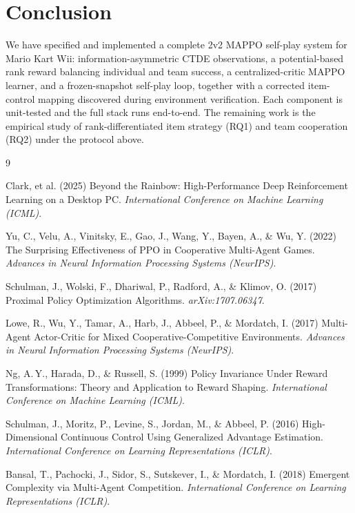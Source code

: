 \documentclass{article}
\begin{document}
\section{Conclusion}

We have specified and implemented a complete 2v2 MAPPO self-play system for Mario
Kart Wii: information-asymmetric CTDE observations, a potential-based rank reward
balancing individual and team success, a centralized-critic MAPPO learner, and a
frozen-snapshot self-play loop, together with a corrected item-control mapping
discovered during environment verification. Each component is unit-tested and the
full stack runs end-to-end. The remaining work is the empirical study of
rank-differentiated item strategy (RQ1) and team cooperation (RQ2) under the
protocol above.


\begin{thebibliography}{9}
\small

Clark, et al. (2025) Beyond the Rainbow: High-Performance Deep Reinforcement
Learning on a Desktop PC. \textit{International Conference on Machine Learning
(ICML)}.

Yu, C., Velu, A., Vinitsky, E., Gao, J., Wang, Y., Bayen, A., \& Wu, Y. (2022)
The Surprising Effectiveness of PPO in Cooperative Multi-Agent Games.
\textit{Advances in Neural Information Processing Systems (NeurIPS)}.

Schulman, J., Wolski, F., Dhariwal, P., Radford, A., \& Klimov, O. (2017)
Proximal Policy Optimization Algorithms. \textit{arXiv:1707.06347}.

Lowe, R., Wu, Y., Tamar, A., Harb, J., Abbeel, P., \& Mordatch, I. (2017)
Multi-Agent Actor-Critic for Mixed Cooperative-Competitive Environments.
\textit{Advances in Neural Information Processing Systems (NeurIPS)}.

Ng, A.\,Y., Harada, D., \& Russell, S. (1999) Policy Invariance Under Reward
Transformations: Theory and Application to Reward Shaping.
\textit{International Conference on Machine Learning (ICML)}.

Schulman, J., Moritz, P., Levine, S., Jordan, M., \& Abbeel, P. (2016)
High-Dimensional Continuous Control Using Generalized Advantage Estimation.
\textit{International Conference on Learning Representations (ICLR)}.

Bansal, T., Pachocki, J., Sidor, S., Sutskever, I., \& Mordatch, I. (2018)
Emergent Complexity via Multi-Agent Competition.
\textit{International Conference on Learning Representations (ICLR)}.

\end{thebibliography}
\end{document}

